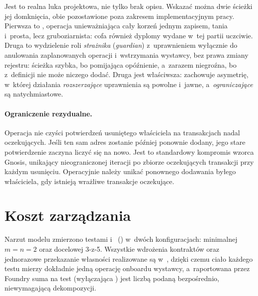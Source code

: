 Jest to realna luka projektowa, nie tylko brak opisu. Wskazać można dwie ścieżki
jej domknięcia, obie pozostawione poza zakresem implementacyjnym pracy. Pierwsza
to , operacja unieważniająca cały korzeń jednym zapisem,
tania i~prosta, lecz gruboziarnista: cofa również dyplomy wydane w~tej partii
uczciwie. Druga to wydzielenie roli \emph{strażnika} (\emph{guardian})
z~uprawnieniem wyłącznie do anulowania zaplanowanych operacji i~wstrzymania
wystawcy, bez prawa zmiany rejestru: ścieżka szybka, bo pomijająca opóźnienie,
a~zarazem niegroźna, bo z~definicji nie może niczego dodać. Druga jest właściwsza:
zachowuje asymetrię, w~której działania \emph{rozszerzające} uprawnienia są powolne
i~jawne, a~\emph{ograniczające} są natychmiastowe.

\paragraph{Ograniczenie rezydualne.} Operacja  nie czyści
potwierdzeń usuniętego właściciela na transakcjach nadal oczekujących. Jeśli ten sam
adres zostanie później ponownie dodany, jego stare potwierdzenie zaczyna liczyć się
na nowo. Jest to standardowy kompromis wzorca Gnosis, unikający nieograniczonej
iteracji po zbiorze oczekujących transakcji przy każdym usunięciu. Operacyjnie
należy unikać ponownego dodawania byłego właściciela, gdy istnieją wrażliwe
transakcje oczekujące.

\section{Koszt zarządzania}
\label{sec:gov-koszt}

Narzut modelu zmierzono testami 
i~ () w~dwóch
konfiguracjach: minimalnej $m=n=2$ oraz docelowej 3-z-5. Wszystkie wdrożenia
kontraktów oraz jednorazowe przekazanie własności realizowane są
w~, dzięki czemu ciało każdego testu mierzy dokładnie jedną
operację onboardu wystawcy, a~raportowana przez Foundry suma na test
(wyłączająca ) jest liczbą podaną bezpośrednio, niewymagającą
dekompozycji.

